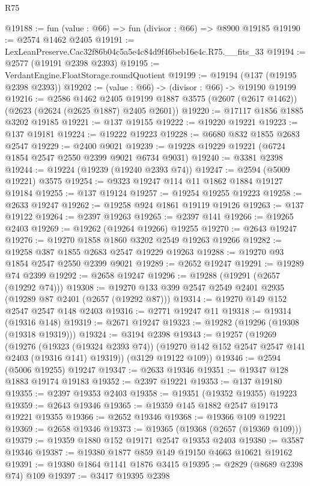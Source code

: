 \begin{lexlean}{R75}
\begin{coremodule}
@19188 := fun (value : @66) => fun (divisor : @66) => @8900 @19185
@19190 := @2574 @1462 @2405
@19191 := LexLeanPreserve.Cac32f86b04c5a5e4c84d9f46beb16e4c.R75.__fits_33
@19194 := @2577 (@19191 @2398 @2393)
@19195 := VerdantEngine.FloatStorage.roundQuotient
@19199 := @19194 (@137 (@19195 @2398 @2393))
@19202 := (value : @66) -> (divisor : @66) -> @19190 @19199
@19216 := @2586
    @1462
    @2405
    @19199
    @1887
    @3575
    (@2607 (@2617 @1462))
    (@2623 (@2624 (@2625 @1887) @2405 @2601))
@19220 := @17117 @1856 @1885 @3202 @19185
@19221 := @137 @19155
@19222 := @19220 @19221
@19223 := @137 @19181
@19224 := @19222 @19223
@19228 := @6680 @832 @1855 @2683 @2547
@19229 := @2400 @9021
@19239 := @19228 @19229 @19221 (@6724 @1854 @2547 @2550 @2399 @9021 @6734 @9031)
@19240 := @3381 @2398
@19244 := @19224 (@19239 (@19240 @2393 @74))
@19247 := @2594 (@5009 @19221) @3575
@19254 := @9323 @19247 @114 @11 @1862 @1884 @19127 @19184
@19255 := @137 @19124
@19257 := @19254 @19255 @19223
@19258 := @2633 @19247
@19262 := @19258 @924 @1861 @19119 @19126
@19263 := @137 @19122
@19264 := @2397 @19263
@19265 := @2397 @141
@19266 := @19265 @2403
@19269 := @19262 (@19264 @19266) @19255
@19270 := @2643 @19247
@19276 := @19270 @1858 @1860 @3202 @2549 @19263 @19266
@19282 := @19258 @387 @1855 @2683 @2547 @19229 @19263
@19288 := @19270 @93 @1854 @2547 @2550 @2399 @9021
@19289 := @2652 @19247
@19291 := @19289 @74 @2399
@19292 := @2658 @19247
@19296 := @19288 (@19291 (@2657 (@19292 @74)))
@19308 := @19270 @133 @399 @2547 @2549 @2401 @2935 (@19289 @87 @2401 (@2657 (@19292 @87)))
@19314 := @19270 @149 @152 @2547 @2547 @148 @2403
@19316 := @2771 @19247 @11
@19318 := @19314 (@19316 @148)
@19319 := @2671 @19247
@19323 := @19282 (@19296 (@19308 (@19318 @19319)))
@19324 := @3194 @2398
@19343 := @19257
    (@19269
      (@19276
        (@19323 (@19324 @2393 @74))
        (@19270 @142 @152 @2547 @2547 @141 @2403 (@19316 @141) @19319))
      (@3129 @19122 @109))
@19346 := @2594 (@5006 @19255) @19247
@19347 := @2633 @19346
@19351 := @19347 @128 @1883 @19174 @19183
@19352 := @2397 @19221
@19353 := @137 @19180
@19355 := @2397 @19353 @2403
@19358 := @19351 (@19352 @19355) @19223
@19359 := @2643 @19346
@19365 := @19359 @145 @1882 @2547 @19173 @19221 @19355
@19366 := @2652 @19346
@19368 := @19366 @109 @19221
@19369 := @2658 @19346
@19373 := @19365 (@19368 (@2657 (@19369 @109)))
@19379 := @19359 @1880 @152 @19171 @2547 @19353 @2403
@19380 := @3587 @19346
@19387 := @19380 @1877 @859 @149 @19150 @4663 @10621 @19162
@19391 := @19380 @1864 @1141 @1876 @3415
@19395 := @2829 (@8689 @2398 @74) @109
@19397 := @3417 @19395 @2398

\end{coremodule}
\end{lexlean}
